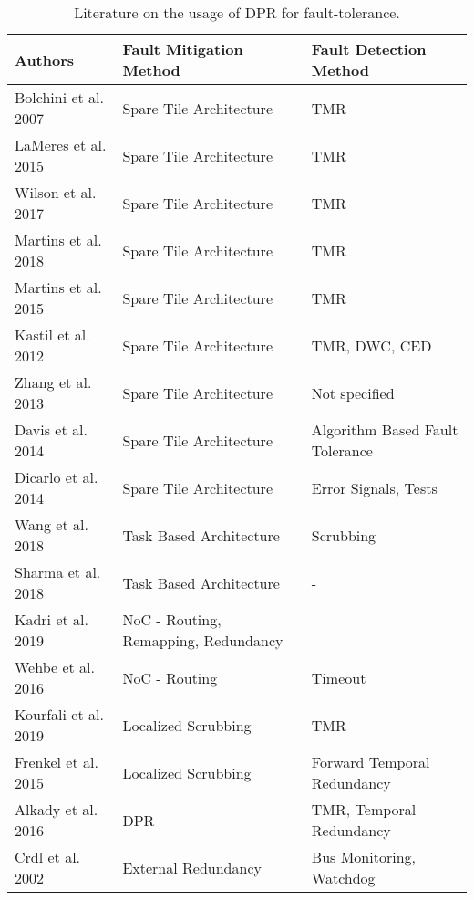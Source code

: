 \begin{table*}
    \caption{Literature on the usage of \gls{DPR} for fault-tolerance.}
    \label{tbl:literatureOverview}
    \begin{tabular*}{\textwidth}{@{\extracolsep{\fill}}lll}
        \toprule
       \textbf{Authors} & \textbf{Fault Mitigation Method} & \textbf{Fault Detection Method} \\
       \midrule
       \cite{bolchini2007} Bolchini et al. 2007             & Spare Tile Architecture      & TMR  \\
       \cite{lameres_radsat_2015} LaMeres et al. 2015       & Spare Tile Architecture      & TMR  \\
       \cite{wilson_hybrid_2017} Wilson et al. 2017         & Spare Tile Architecture      & TMR  \\
       \cite{martins_dynamic_2018} Martins et al. 2018      & Spare Tile Architecture      & TMR  \\
       \cite{martins_tmr_2015} Martins et al. 2015          & Spare Tile Architecture      & TMR  \\
       \cite{kastil2012} Kastil et al. 2012                 & Spare Tile Architecture      & TMR, DWC, CED  \\
       \cite{zhang2013} Zhang et al. 2013                   & Spare Tile Architecture      & Not specified \\
       \cite{davis2014} Davis et al. 2014                   & Spare Tile Architecture      & Algorithm Based Fault Tolerance \\
       \cite{dicarlo2014} Dicarlo et al. 2014               & Spare Tile Architecture      & Error Signals, Tests \\
       \cite{wang_dynamic_2018} Wang et al. 2018            & Task Based Architecture      & Scrubbing \\
       \cite{sharma_run-time_2018} Sharma et al. 2018       & Task Based Architecture      & - \\
       \cite{kadri_survey_2019} Kadri et al. 2019           & NoC - Routing, Remapping, Redundancy                        & - \\
       \cite{wehbe_secure_2016} Wehbe et al. 2016           & NoC - Routing               & Timeout\\
       \cite{kourfali2019} Kourfali et al. 2019             & Localized Scrubbing           & TMR \\
       \cite{frenkel2015} Frenkel et al. 2015               & Localized Scrubbing       & Forward Temporal Redundancy \\
       \cite{alkady_integration_2016} Alkady et al. 2016    & \gls{DPR}             & TMR, Temporal Redundancy \\
       \cite{crdl_fail-safe_2002} Crdl et al. 2002          & External Redundancy           & Bus Monitoring, Watchdog \\
       \bottomrule
    \end{tabular*}
\end{table*}

